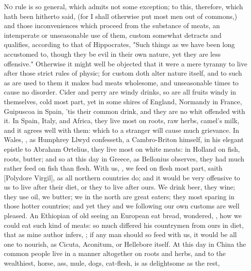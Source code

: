 \lettrine{N}{o} rule is so general, which admits not some exception; to this,
therefore, which hath been hitherto said, (for I shall otherwise put most men
out of commons,) and those inconveniences which proceed from the substance of
meats, an intemperate or unseasonable use of them, custom somewhat detracts and
qualifies, according to that of Hippocrates,  "Such things as we have been long accustomed to,
though they be evil in their own nature, yet they are less offensive."
Otherwise it might well be objected that it were a mere
tyranny to live after those strict rules of physic; for
custom doth alter nature itself, and to such as are used
to them it makes bad meats wholesome, and unseasonable times to cause no
disorder. Cider and perry are windy drinks, so are all fruits windy in
themselves, cold most part, yet in some shires of England,
Normandy in France, Guipuscoa in Spain, 'tis their common drink, and they are
no whit offended with it. In Spain, Italy, and Africa, they live most on roots,
raw herbs, camel's milk, and it agrees well with them:
which to a stranger will cause much grievance. In Wales, , as Humphrey Llwyd confesseth, a Cambro-Briton himself, in his
elegant epistle to Abraham Ortelius, they live most on white meats: in Holland
on fish, roots, butter; and so at this day in Greece, as
Bellonius observes, they had much rather feed on fish than
flesh. With us, , we feed on flesh
most part, saith [Polydore
Virgil], as all northern countries do; and it would be very offensive to us to
live after their diet, or they to live after ours. We drink beer, they wine;
they use oil, we butter; we in the north are great eaters;
they most sparing in those hotter countries; and yet they and we following our
own customs are well pleased. An Ethiopian of old seeing an European eat bread,
wondered, , how we could eat such
kind of meats: so much differed his countrymen from ours in diet, that as mine
author infers, ; if any man should so feed with us, it would be all one to
nourish, as Cicuta, Aconitum, or Hellebore itself. At this day in China the
common people live in a manner altogether on roots and herbs, and to the
wealthiest, horse, ass, mule, dogs, cat-flesh, is as delightsome as the rest,

